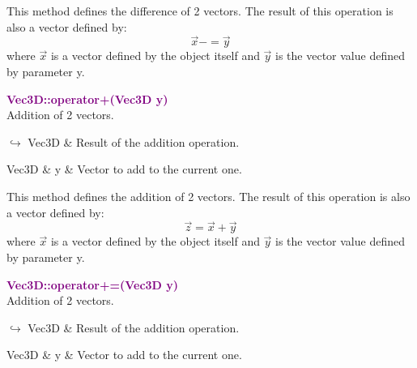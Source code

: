 This method defines the difference of 2 vectors.
The result of this operation is also a vector defined by:
\begin{equation*}
\overrightarrow{x} -= \overrightarrow{y}
\end{equation*}
where $\overrightarrow{x}$ is a vector defined by the object itself and $\overrightarrow{y}$ is the vector value defined by parameter y.

\textcolor{purple}{\textbf{Vec3D::operator+(Vec3D y)}}\label{Vec3D::operator+(Vec3D y)}\\
Addition of 2 vectors.\vspace*{-0.5em}
\begin{tcolorbox}[grow to left by=-1cm, width=\textwidth-1cm,myArgs,tabularx={l|R}]
$\hookrightarrow$ Vec3D & Result of the addition operation.
\end{tcolorbox}

\begin{tcolorbox}[width=\textwidth,myArgs,tabularx={ll|R}]
Vec3D & y & Vector to add to the current one.
\end{tcolorbox}

This method defines the addition of 2 vectors.
The result of this operation is also a vector defined by:
\begin{equation*}
\overrightarrow{z} = \overrightarrow{x} + \overrightarrow{y}
\end{equation*}
where $\overrightarrow{x}$ is a vector defined by the object itself and $\overrightarrow{y}$ is the vector value defined by parameter y.

\textcolor{purple}{\textbf{Vec3D::operator+=(Vec3D y)}}\label{Vec3D::operator+=(Vec3D y)}\\
Addition of 2 vectors.\vspace*{-0.5em}
\begin{tcolorbox}[grow to left by=-1cm, width=\textwidth-1cm,myArgs,tabularx={l|R}]
$\hookrightarrow$ Vec3D & Result of the addition operation.
\end{tcolorbox}

\begin{tcolorbox}[width=\textwidth,myArgs,tabularx={ll|R}]
Vec3D & y & Vector to add to the current one.
\end{tcolorbox}

